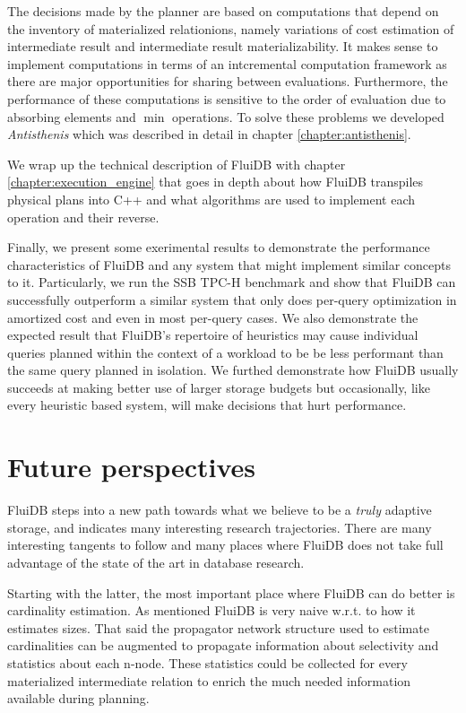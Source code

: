The decisions made by the planner are based on computations that
depend on the inventory of materialized relationions, namely
variations of cost estimation of intermediate result and intermediate
result materializability. It makes sense to implement computations in
terms of an intcremental computation framework as there are major
opportunities for sharing between evaluations. Furthermore, the
performance of these computations is sensitive to the order of
evaluation due to absorbing elements and \(\min\) operations. To solve
these problems we developed \emph{Antisthenis} which was described in
detail in chapter \ref{chapter:antisthenis}.

We wrap up the technical description of FluiDB with chapter
\ref{chapter:execution_engine} that goes in depth about how FluiDB
transpiles physical plans into C++ and what algorithms are used to
implement each operation and their reverse.

Finally, we present some exerimental results to demonstrate the
performance characteristics of FluiDB and any system that might
implement similar concepts to it. Particularly, we run the SSB TPC-H
benchmark and show that FluiDB can successfully outperform a similar
system that only does per-query optimization in amortized cost and
even in most per-query cases. We also demonstrate the expected result
that FluiDB's repertoire of heuristics may cause individual queries
planned within the context of a workload to be be less performant than
the same query planned in isolation. We furthed demonstrate how FluiDB
usually succeeds at making better use of larger storage budgets but
occasionally, like every heuristic based system, will make decisions
that hurt performance.

\section{Future perspectives}

FluiDB steps into a new path towards what we believe to be a
\emph{truly} adaptive storage, and indicates many interesting research
trajectories. There are many interesting tangents to follow and many
places where FluiDB does not take full advantage of the state of the
art in database research.

Starting with the latter, the most important place where FluiDB can do
better is cardinality estimation. As mentioned FluiDB is very naive
w.r.t. to how it estimates sizes. That said the propagator network
structure used to estimate cardinalities can be augmented to propagate
information about selectivity and statistics about each n-node. These
statistics could be collected for every materialized intermediate
relation to enrich the much needed information available during
planning.


